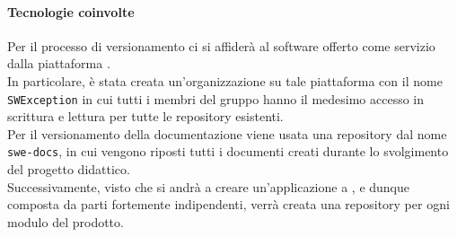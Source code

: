 \paragraph{Tecnologie coinvolte}
Per il processo di versionamento ci si affiderà al software  offerto come servizio dalla piattaforma .\\
In particolare, è stata creata un'organizzazione su tale piattaforma con il nome \verb|SWException| in cui tutti i membri del gruppo
hanno il medesimo accesso in scrittura e lettura per tutte le repository esistenti.\\
Per il versionamento della documentazione viene usata una repository dal nome \verb|swe-docs|, in cui vengono riposti tutti i
documenti creati durante lo svolgimento del progetto didattico.\\
Successivamente, visto che si andrà a creare un'applicazione a , e dunque composta da parti fortemente indipendenti,
verrà creata una repository per ogni modulo del prodotto.

